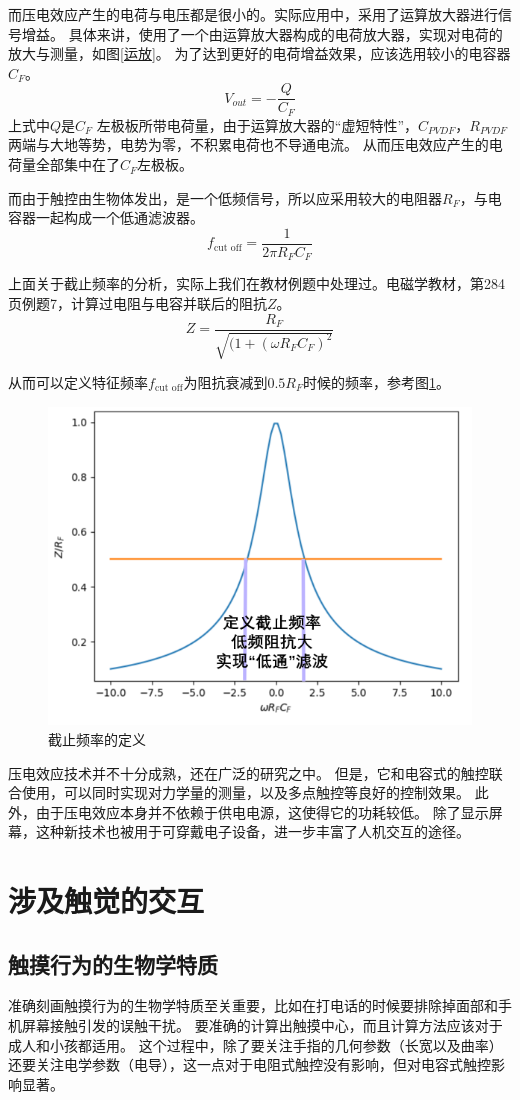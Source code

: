 \documentclass[UTF-8]{ctexart}
\begin{document}
而压电效应产生的电荷与电压都是很小的。实际应用中，采用了运算放大器进行信号增益。
具体来讲，使用了一个由运算放大器构成的电荷放大器\cite{circuit}，实现对电荷的放大与测量，如图\ref{运放}。
为了达到更好的电荷增益效果，应该选用较小的电容器$C_F$。
$$
V_{out}=-\frac{Q}{C_F}
$$
上式中$Q$是$C_F$ 左极板所带电荷量，由于运算放大器的“虚短特性”，$C_{PVDF}$，$R_{PVDF}$两端与大地等势，电势为零，不积累电荷也不导通电流。
从而压电效应产生的电荷量全部集中在了$C_F$左极板。

而由于触控由生物体发出，是一个低频信号，所以应采用较大的电阻器$R_F$，与电容器一起构成一个低通滤波器。
$$
f_{\text{cut off}}=\frac{1}{2\pi R_FC_F}
$$

上面关于截止频率的分析，实际上我们在教材例题中处理过。电磁学教材，第284页例题7，计算过电阻与电容并联后的阻抗$Z$。
$$
Z=\frac{R_F}{\sqrt{(1+(\omega R_FC_F)^2}}
$$

从而可以定义特征频率$f_{\text{cut off}}$为阻抗衰减到$0.5R_F$时候的频率，参考图\ref{截止频率的定义}。
\begin{figure}
    \centering
    \includegraphics[width=0.6\linewidth]{../Figures/cut off frequency.png}
    \caption{截止频率的定义}
    \label{截止频率的定义}
\end{figure}

压电效应技术并不十分成熟，还在广泛的研究之中。
但是，它和电容式的触控联合使用，可以同时实现对力学量的测量，以及多点触控等良好的控制效果。
此外，由于压电效应本身并不依赖于供电电源，这使得它的功耗较低。
除了显示屏幕，这种新技术也被用于可穿戴电子设备，进一步丰富了人机交互的途径。


\section{涉及触觉的交互}
\subsection{触摸行为的生物学特质}
准确刻画触摸行为的生物学特质至关重要，比如在打电话的时候要排除掉面部和手机屏幕接触引发的误触干扰。
要准确的计算出触摸中心，而且计算方法应该对于成人和小孩都适用。
这个过程中，除了要关注手指的几何参数（长宽以及曲率）还要关注电学参数（电导），这一点对于电阻式触控没有影响，但对电容式触控影响显著。
\end{document}
